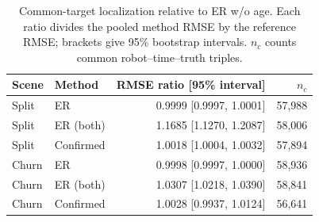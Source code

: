 \begin{table}[t]
\centering
\caption{Common-target localization relative to ER w/o age. Each ratio divides the pooled method RMSE by the reference RMSE; brackets give 95\% bootstrap intervals. $n_c$ counts common robot--time--truth triples.}
\label{tab:common}
\footnotesize
\begin{tabular}{llrr}
\toprule
Scene & Method & RMSE ratio [95\% interval] & $n_c$\\
\midrule
Split & ER & 0.9999 [0.9997, 1.0001] & 57,988\\
Split & ER (both) & 1.1685 [1.1270, 1.2087] & 58,006\\
Split & Confirmed & 1.0018 [1.0004, 1.0032] & 57,894\\
Churn & ER & 0.9998 [0.9997, 1.0000] & 58,936\\
Churn & ER (both) & 1.0307 [1.0218, 1.0390] & 58,841\\
Churn & Confirmed & 1.0028 [0.9937, 1.0124] & 56,641\\
\bottomrule
\end{tabular}
\end{table}
